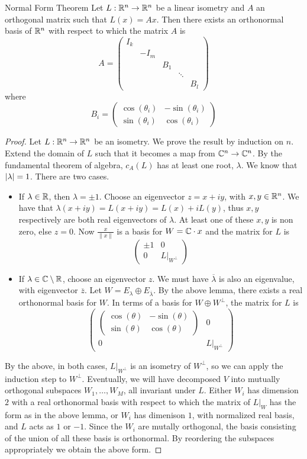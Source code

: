 \documentclass[a4paper]{article}
\begin{document}
\begin{thm}{Normal Form Theorem}{} Let $L:\mathbb{R}^n\to\mathbb{R}^n$ be a linear isometry and $A$ an orthogonal matrix such that $L(x)=Ax$. Then there exists an orthonormal basis of $\mathbb{R}^n$ with respect to which the matrix $A$ is $$A=\begin{pmatrix}
I_k &&&&\\
&-I_m&&&\\
&&B_1&&\\
&&&\ddots&\\
&&&&B_l
\end{pmatrix}$$ where $$B_i=\begin{pmatrix}\cos(\theta_i) & -\sin(\theta_i) \\
\sin(\theta_i) & \cos(\theta_i)
\end{pmatrix}$$\tcbline
\begin{proof}
Let $L:\mathbb{R}^n\to\mathbb{R}^n$ be an isometry. We prove the result by induction on $n$. Extend the domain of $L$ such that it becomes a map from $\mathbb{C}^n\to\mathbb{C}^n$. By the fundamental theorem of algebra, $c_A(L)$ has at least one root, $\lambda$. We know that $\abs{\lambda}=1$. There are two cases. 
\begin{itemize}
\item If $\lambda\in\mathbb{R}$, then $\lambda=\pm1$. Choose an eigenvector $z=x+iy$, with $x,y\in\mathbb{R}^n$. We have that $\lambda(x+iy)=L(x+iy)=L(x)+iL(y)$, thus $x,y$ respectively are both real eigenvectors of $\lambda$. At least one of these $x,y$ is non zero, else $z=0$. Now $\frac{x}{\|x\|}$ is a basis for $W=\mathbb{C}\cdot x$ and the matrix for $L$ is $$\begin{pmatrix}
\pm1 & 0\\
0 & L|_{W^\perp}
\end{pmatrix}$$
\item If $\lambda\in\mathbb{C}\setminus\mathbb{R}$, choose an eigenvector $z$. We must have $\overline{\lambda}$ is also an eigenvalue, with eigenvector $\overline{z}$. Let $W=E_{\lambda}\oplus E_{\overline{\lambda}}$. By the above lemma, there exists a real orthonormal basis for $W$. In terms of a basis for $W\oplus W^\perp$, the matrix for $L$ is $$\begin{pmatrix}
\begin{pmatrix}
\cos(\theta) & -\sin(\theta) \\
\sin(\theta) & \cos(\theta)
\end{pmatrix} & 0\\
0 & L|_{W^\perp}
\end{pmatrix}$$
\end{itemize}
By the above, in both cases, $L|_{W^\perp}$ is an isometry of $W^\perp$, so we can apply the induction step to $W^\perp$. Eventually, we will have decomposed $V$ into mutually orthogonal subspaces $W_1,\dots,W_M$, all invariant under $L$. Either $W_i$ has dimension $2$ with a real orthonormal basis with respect to which the matrix of $L|_W$ has the form as in the above lemma, or $W_i$ has dimenison $1$, with normalized real basis, and $L$ acts as $1$ or $-1$. Since the $W_i$ are mutally orthogonal, the basis consisting of the union of all these basis is orthonormal. By reordering the subspaces appropriately we obtain the above form. 
\end{proof}
\end{thm}
\end{document}
